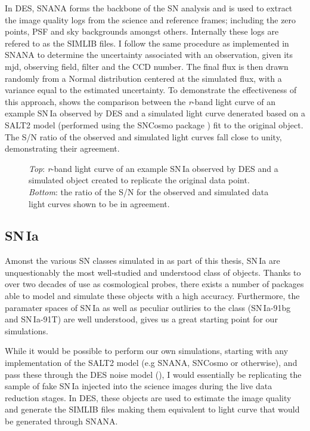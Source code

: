 In DES, SNANA forms the backbone of the SN analysis and is used to extract the image quality logs from the science and reference frames; including the zero points, PSF and sky backgrounds amongst others. Internally these logs are refered to as the \textsc{SIMLIB} files. I follow the same procedure as implemented in SNANA to determine the uncertainty associated with an observation, given its mjd, observing field, filter and the CCD number. The final flux is then drawn randomly from a Normal distribution centered at the simulated flux, with a variance equal to the estimated uncertainty. To demonstrate the effectiveness of this approach,  shows the comparison between the \textit{r}-band light curve of an example SN\,Ia observed by DES and a simulated light curve denerated based on a SALT2 model (performed using the SNCosmo package \citep{Barbary2014}) fit to the original object. The S/N ratio of the observed and simulated light curves fall close to unity, demonstrating their agreement.

\begin{figure}
  \caption{\textit{Top}: \textit{r}-band light curve of an example SN\,Ia observed by DES and a simulated object created to replicate the original data point. \textit{Bottom}: the ratio of the S/N for the observed and simulated data light curves shown to be in agreement.}
  \label{fig:IaNoiseComp}
\end{figure}

\subsection{SN\,Ia}
Amonst the various SN classes simulated in as part of this thesis, SN\,Ia are unquestionably the most well-studied and understood class of objects. Thanks to over two decades of use as cosmological probes, there exists a number of packages able to model and simulate these objects with a high accuracy. Furthermore, the paramater spaces of SN\,Ia as well as peculiar outliries to the class (SN\,Ia-91bg and SN\,Ia-91T) are well understood, gives us a great starting point for our simulations.

While it would be possible to perform our own simulations, starting with any implementation of the SALT2 model (e.g SNANA, SNCosmo or otherwise), and pass these through the DES noise model (), I would essentially be replicating the sample of fake SN\,Ia injected into the science images during the live data reduction stages. In DES, these objects are used to estimate the image quality and generate the \textsc{SIMLIB} files making them equivalent to light curve that would be generated through SNANA.

